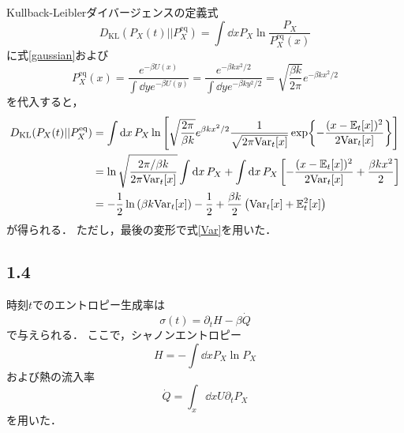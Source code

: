 \documentclass[a4paper,11pt]{jsarticle}
\begin{document}
Kullback-Leiblerダイバージェンスの定義式
\begin{equation}
  D_{\mathrm{KL}}(P_X(t)||P_X^{\mathrm{eq}}) = \int \dd{x} P_X \ln{\frac{P_X}{P_X^{\mathrm{eq}}(x)}}
\end{equation}
に式\eqref{gaussian}および
\begin{equation}
  P_X^{\mathrm{eq}}(x) = \frac{e^{-\beta U(x)}}{\int \dd{y} e^{-\beta U(y)}} = \frac{e^{-\beta k x^2/2}}{\int \dd{y} e^{-\beta k y^2/2}} = \sqrt{\frac{\beta k}{2\pi}} e^{-\beta k x^2/2}
\end{equation}
を代入すると，
\begin{align}
  D_{\mathrm{KL}}(P_X(t)||P_X^{\mathrm{eq}}) 
  &= \int \dd{x} P_X \ln{\left[\sqrt{\frac{2\pi}{\beta k}} e^{\beta k x^2/2} \frac{1}{\sqrt{2\pi \mathrm{Var}_t[x]}} \exp{-\frac{(x-\mathbb{E}_t[x])^2}{2\mathrm{Var}_t[x]}}\right]} \notag\\
  &= \ln{\sqrt{\frac{2\pi/\beta k}{2\pi \mathrm{Var}_t[x]}}} \int \dd{x} P_X + \int \dd{x} P_X \left[-\frac{(x-\mathbb{E}_t[x])^2}{2\mathrm{Var}_t[x]} + \frac{\beta k x^2}{2}\right] \notag\\
  &= - \frac{1}{2}\ln{\left(\beta k \mathrm{Var}_t[x]\right)} - \frac{1}{2} + \frac{\beta k}{2} \left(\mathrm{Var}_t[x] + \mathbb{E}_t^2[x]\right) \label{KL}
\end{align}
が得られる．
ただし，最後の変形で式\eqref{Var}を用いた．

\subsection*{1.4}

時刻$t$でのエントロピー生成率は
\begin{equation}
  \sigma(t) = \partial_t H - \beta \dot{Q} \label{sigma}
\end{equation}
で与えられる．
ここで，シャノンエントロピー
\begin{equation}
  H = - \int \dd{x} P_X \ln{P_X}
\end{equation}
および熱の流入率
\begin{equation}
  \dot{Q} = \int_x \dd{x} U \partial_t P_X
\end{equation}
を用いた．
\end{document}
